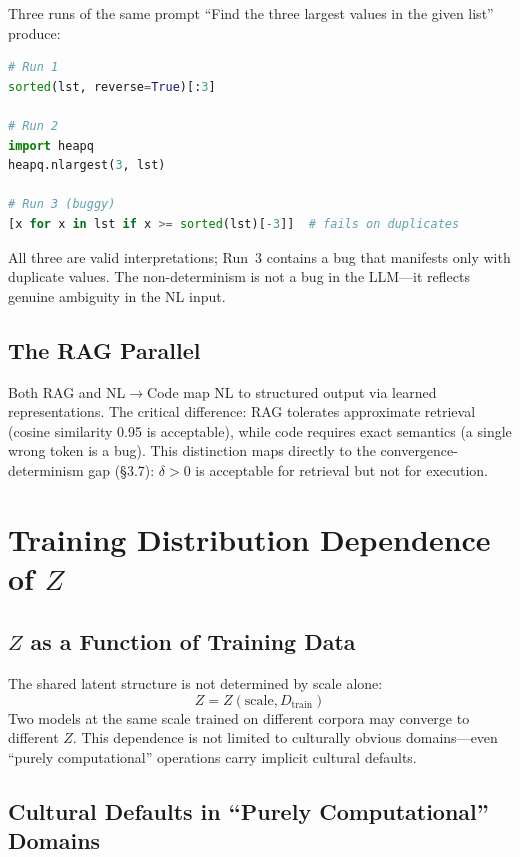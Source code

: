 \documentclass{article}
\theoremstyle{definition}
\newcommand{\Dtrain}{D_{\text{train}}}
\begin{document}
Three runs of the same prompt ``Find the three largest values in the given list'' produce:

\begin{lstlisting}[language=Python]
# Run 1
sorted(lst, reverse=True)[:3]

# Run 2
import heapq
heapq.nlargest(3, lst)

# Run 3 (buggy)
[x for x in lst if x >= sorted(lst)[-3]]  # fails on duplicates
\end{lstlisting}

All three are valid interpretations; Run~3 contains a bug that manifests only with duplicate values. The non-determinism is not a bug in the LLM---it reflects genuine ambiguity in the NL input.

\subsection{The RAG Parallel}

Both RAG and NL$\to$Code map NL to structured output via learned representations. The critical difference: RAG tolerates approximate retrieval (cosine similarity 0.95 is acceptable), while code requires exact semantics (a single wrong token is a bug). This distinction maps directly to the convergence-determinism gap (\S3.7): $\delta > 0$ is acceptable for retrieval but not for execution.

\section{Training Distribution Dependence of $Z$}\label{app:dtrain}

\subsection{$Z$ as a Function of Training Data}

The shared latent structure is not determined by scale alone:
\[
Z = Z(\text{scale}, \Dtrain)
\]
Two models at the same scale trained on different corpora may converge to different $Z$. This dependence is not limited to culturally obvious domains---even ``purely computational'' operations carry implicit cultural defaults.

\subsection{Cultural Defaults in ``Purely Computational'' Domains}
\end{document}
